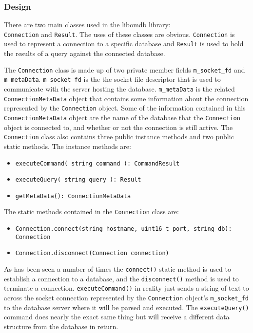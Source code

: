 \documentclass[letterpaper, 12pt]{article}
\begin{document}
  \par\vspace{\baselineskip}
  
  \subsubsection{Design}
  There are two main classes used in the libomdb library:  \\
  \lstinline|Connection| and \lstinline|Result|. The uses of these classes 
  are obvious. \lstinline|Connection| is used to represent a connection to 
  a specific database and \lstinline|Result| is used to hold the results of a 
  query against the connected database. 
  
  \par\vspace{\baselineskip}
  The \lstinline|Connection| class is made up of two private 
  member fields \lstinline|m_socket_fd| and
  \lstinline|m_metaData|. 
  \lstinline|m_socket_fd| is the the socket file descriptor that is
  used to communicate with the server hosting the database. 
  \lstinline|m_metaData| is the related
  \lstinline|ConnectionMetaData| object that contains some 
  information about the connection represented by the 
  \lstinline|Connection| object. Some of the information contained
  in this \lstinline|ConnectionMetaData| object are 
  the name of the database that the \lstinline|Connection| object
  is connected to, and whether or not the connection is still active. The 
  \lstinline|Connection| class also contains three public 
  instance methods and two public static methods. The instance methods are:
  \begin{itemize}
    \item \lstinline|executeCommand( string command ): CommandResult|
    \item \lstinline|executeQuery( string query ): Result|
    \item \lstinline|getMetaData(): ConnectionMetaData| 
  \end{itemize}   
  The static methods contained in the \lstinline|Connection| class
  are: 
  \begin{itemize}
  	\item \lstinline|Connection.connect(string hostname, uint16_t port, string db): Connection|
  	\item \lstinline|Connection.disconnect(Connection connection)|
  \end{itemize}    
  As has been seen a number of times the \lstinline|connect()| 
  static method is used  to establish a connection to a database, and the 
  \lstinline|disconnect()| method is used to terminate a connection.
  \lstinline|executeCommand()| in reality just sends a string of
  text to across the socket connection represented by the 
  \lstinline|Connection| object's 
  \lstinline|m_socket_fd| to the database server where it will be 
  parsed and executed. The \lstinline|executeQuery()| command
  does nearly the exact same thing but will receive a different data structure from the 
  database in return.
  
\end{document}
